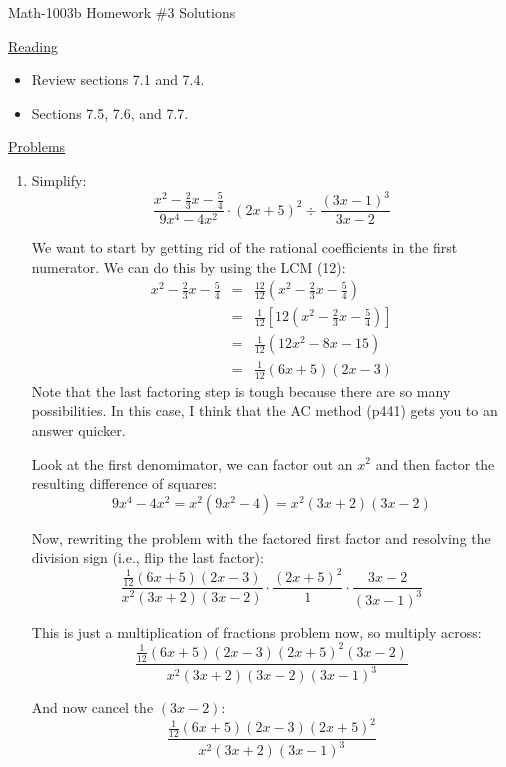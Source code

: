 \documentclass[letterpaper,12pt,fleqn]{article}
\begin{document}
\begin{center}
\Large Math-1003b Homework \#3 Solutions
\end{center}

\vspace{0.5in}

\underline{Reading}

\bigskip

\begin{itemize}
\item Review sections 7.1 and 7.4.
\item Sections 7.5, 7.6, and 7.7.
\end{itemize}

\bigskip

\underline{Problems}

\bigskip

\begin{enumerate}
\item Simplify:
  \[\frac{x^2-\frac{2}{3}x-\frac{5}{4}}{9x^4-4x^2}\cdot(2x+5)^2\div
  \frac{(3x-1)^3}{3x-2}\]

  We want to start by getting rid of the rational coefficients in the first numerator.
  We can do this by using the LCM (12):
  \begin{eqnarray*}
    x^2-\frac{2}{3}x-\frac{5}{4} &=&
    \frac{12}{12}\left(x^2-\frac{2}{3}x-\frac{5}{4}\right) \\
    &=& \frac{1}{12}\left[12\left(x^2-\frac{2}{3}x-\frac{5}{4}\right)\right] \\
    &=& \frac{1}{12}(12x^2-8x-15) \\
    &=& \frac{1}{12}(6x+5)(2x-3)
  \end{eqnarray*}
  Note that the last factoring step is tough because there are so many possibilities.
  In this case, I think that the AC method (p441) gets you to an answer quicker.

  Look at the first denomimator, we can factor out an $x^2$ and then factor the resulting
  difference of squares:
  \[9x^4-4x^2=x^2(9x^2-4)=x^2(3x+2)(3x-2)\]

  Now, rewriting the problem with the factored first factor and resolving the division
  sign (i.e., flip the last factor):
  \[\frac{\frac{1}{12}(6x+5)(2x-3)}{x^2(3x+2)(3x-2)}\cdot\frac{(2x+5)^2}{1}\cdot
  \frac{3x-2}{(3x-1)^3}\]

  This is just a multiplication of fractions problem now, so multiply across:
  \[\frac{\frac{1}{12}(6x+5)(2x-3)(2x+5)^2(3x-2)}{x^2(3x+2)(3x-2)(3x-1)^3}\]

  And now cancel the $(3x-2)$:
  \[\frac{\frac{1}{12}(6x+5)(2x-3)(2x+5)^2}{x^2(3x+2)(3x-1)^3}\]


\end{enumerate}
\end{document}
